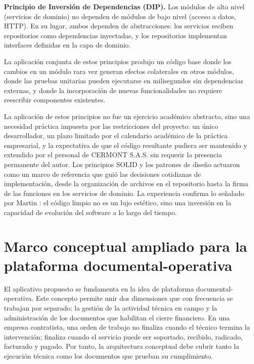 \textbf{Principio de Inversión de Dependencias (DIP).} Los módulos de alto nivel (servicios de dominio) no dependen de módulos de bajo nivel (acceso a datos, HTTP). En su lugar, ambos dependen de abstracciones: los servicios reciben repositorios como dependencias inyectadas, y los repositorios implementan interfaces definidas en la capa de dominio.

La aplicación conjunta de estos principios produjo un código base donde los cambios en un módulo rara vez generan efectos colaterales en otros módulos, donde las pruebas unitarias pueden ejecutarse en milisegundos sin dependencias externas, y donde la incorporación de nuevas funcionalidades no requiere reescribir componentes existentes.

La aplicación de estos principios no fue un ejercicio académico abstracto, sino una necesidad práctica impuesta por las restricciones del proyecto: un único desarrollador, un plazo limitado por el calendario académico de la práctica empresarial, y la expectativa de que el código resultante pudiera ser mantenido y extendido por el personal de CERMONT S.A.S. sin requerir la presencia permanente del autor. Los principios SOLID y los patrones de diseño actuaron como un marco de referencia que guió las decisiones cotidianas de implementación, desde la organización de archivos en el repositorio hasta la firma de las funciones en los servicios de dominio. La experiencia confirma lo señalado por Martin \cite{martin2008}: el código limpio no es un lujo estético, sino una inversión en la capacidad de evolución del software a lo largo del tiempo.

\section{Marco conceptual ampliado para la plataforma documental-operativa}
\label{sec:marco-conceptual-documental-operativo}

El aplicativo propuesto se fundamenta en la idea de plataforma documental-operativa. Este concepto permite unir dos dimensiones que con frecuencia se trabajan por separado: la gestión de la actividad técnica en campo y la administración de los documentos que habilitan el cierre financiero. En una empresa contratista, una orden de trabajo no finaliza cuando el técnico termina la intervención; finaliza cuando el servicio puede ser soportado, recibido, radicado, facturado y pagado. Por tanto, la arquitectura conceptual debe cubrir tanto la ejecución técnica como los documentos que prueban su cumplimiento.

